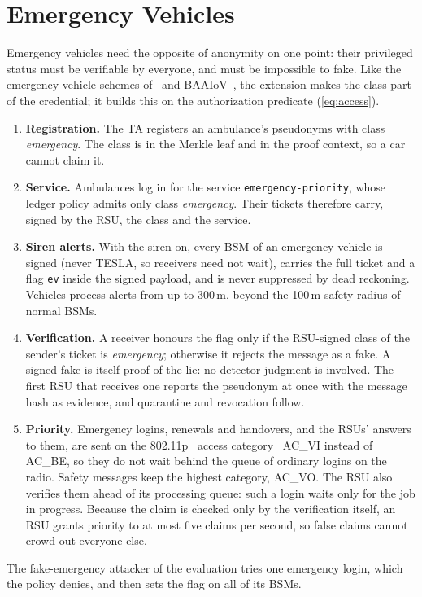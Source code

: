 \section{Emergency Vehicles}\label{sec:emergency}

Emergency vehicles need the opposite of anonymity on one point: their privileged status must be
verifiable by everyone, and must be impossible to fake. Like the emergency-vehicle schemes
of~\cite{li2026emergency} and BAAIoV~\cite{alsaeed2025baaiov}, the extension makes the class part of
the credential; it builds this on the authorization predicate (\ref{eq:access}).
\begin{enumerate}
  \item \textbf{Registration.} The TA registers an ambulance's pseudonyms with class
  \textit{emergency}. The class is in the Merkle leaf and in the proof context,
  so a car cannot claim it.
  \item \textbf{Service.} Ambulances log in for the service \texttt{emergency-priority}, whose ledger
  policy admits only class \textit{emergency}. Their tickets therefore carry, signed by the RSU, the
  class and the service.
  \item \textbf{Siren alerts.} With the siren on, every BSM of an emergency vehicle is signed (never
  TESLA, so receivers need not wait), carries the full ticket and a flag \texttt{ev} inside the
  signed payload, and is never suppressed by dead reckoning. Vehicles process alerts from up to
  300\,m, beyond the 100\,m safety radius of normal BSMs.
  \item \textbf{Verification.} A receiver honours the flag only if the RSU-signed class of the
  sender's ticket is \textit{emergency}; otherwise it rejects the message as a fake. A signed fake is
  itself proof of the lie: no detector judgment is involved. The first RSU that receives one reports
  the pseudonym at once with the message hash as evidence, and quarantine and revocation follow.
  \item \textbf{Priority.} Emergency logins, renewals and handovers, and the RSUs' answers to
  them, are sent on the 802.11p~\cite{jiang2008wave} access category~\cite{kenney2011dsrc} AC\_VI instead of AC\_BE, so they do not wait
  behind the queue of ordinary logins on the radio. Safety messages keep the highest category,
  AC\_VO. The RSU also verifies them ahead of its processing queue: such a login waits only for the
  job in progress. Because the claim is checked only by the verification itself, an RSU grants
  priority to at most five claims per second, so false claims cannot crowd out everyone else.
\end{enumerate}
The fake-emergency attacker of the evaluation tries one emergency login, which the policy denies,
and then sets the flag on all of its BSMs.

